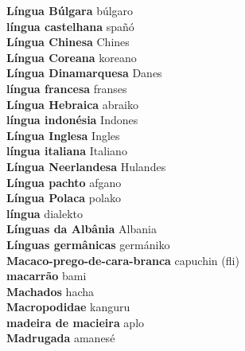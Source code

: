 \textbf{ Língua Búlgara  } búlgaro \\
\textbf{ língua castelhana  } spañó \\
\textbf{ Língua Chinesa  } Chines \\
\textbf{ Língua Coreana  } koreano \\
\textbf{ Língua Dinamarquesa  } Danes \\
\textbf{ língua francesa  } franses \\
\textbf{ Língua Hebraica  } abraiko \\
\textbf{ língua indonésia  } Indones \\
\textbf{ Língua Inglesa  } Ingles \\
\textbf{ língua italiana  } Italiano \\
\textbf{ Língua Neerlandesa  } Hulandes \\
\textbf{ Língua pachto  } afgano \\
\textbf{ Língua Polaca  } polako \\
\textbf{ língua  } dialekto \\
\textbf{ Línguas da Albânia  } Albania \\
\textbf{ Línguas germânicas  } germániko \\
\textbf{ Macaco-prego-de-cara-branca  } capuchin (fli) \\
\textbf{ macarrão  } bami \\
\textbf{ Machados  } hacha \\
\textbf{ Macropodidae  } kanguru \\
\textbf{ madeira de macieira  } aplo \\
\textbf{ Madrugada  } amanesé \\
